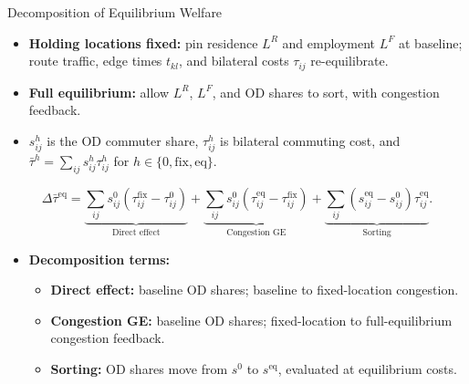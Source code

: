 \documentclass[11pt,aspectratio=169]{beamer}
\begin{document}
\begin{frame}{Decomposition of Equilibrium Welfare}
\begin{itemize}\small\setlength\itemsep{0.65em}
  \item \textbf{Holding locations fixed:} pin residence $L^R$ and employment $L^F$ at baseline; route traffic, edge times $t_{kl}$, and bilateral costs $\tau_{ij}$ re-equilibrate.
  \item \textbf{Full equilibrium:} allow $L^R$, $L^F$, and OD shares to sort, with congestion feedback.
  \item $s_{ij}^{h}$ is the OD commuter share, $\tau_{ij}^{h}$ is bilateral commuting cost, and $\bar\tau^{h}=\sum_{ij}s_{ij}^{h}\tau_{ij}^{h}$ for $h\in\{0,\mathrm{fix},\mathrm{eq}\}$.
\end{itemize}
\vspace{0.45em}
{\footnotesize
\begin{equation*}
\Delta\bar\tau^{\mathrm{eq}}=
\underbrace{\textstyle\sum_{ij}s_{ij}^0\left(\tau_{ij}^{\mathrm{fix}}-\tau_{ij}^0\right)}_{\text{Direct effect}}
+\underbrace{\textstyle\sum_{ij}s_{ij}^0\left(\tau_{ij}^{\mathrm{eq}}-\tau_{ij}^{\mathrm{fix}}\right)}_{\text{Congestion GE}}
+\underbrace{\textstyle\sum_{ij}\left(s_{ij}^{\mathrm{eq}}-s_{ij}^0\right)\tau_{ij}^{\mathrm{eq}}}_{\text{Sorting}}.
\end{equation*}
}
\vspace{0.35em}
\begin{itemize}\small\setlength\itemsep{0.35em}
  \item \textbf{Decomposition terms:}
  \begin{itemize}\footnotesize\setlength\itemsep{0.30em}
    \item \textbf{Direct effect:} baseline OD shares; baseline to fixed-location congestion.
    \item \textbf{Congestion GE:} baseline OD shares; fixed-location to full-equilibrium congestion feedback.
    \item \textbf{Sorting:} OD shares move from $s^0$ to $s^{\mathrm{eq}}$, evaluated at equilibrium costs.
  \end{itemize}
\end{itemize}
\end{frame}
\end{document}
